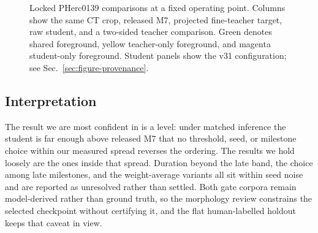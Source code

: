 \begin{figure}[t]
  \centering
  \caption{Locked PHerc0139 comparisons at a fixed operating point.
  Columns show the same CT crop, released M7, projected fine-teacher target, raw
  student, and a two-sided teacher comparison. Green denotes shared foreground,
  yellow teacher-only foreground, and magenta student-only foreground.
  Student panels show the v31 configuration; see
  Sec.~\ref{sec:figure-provenance}.}
  \label{fig:registered}
\end{figure}

\subsection{Interpretation}

The result we are most confident in is a level: under matched inference the
student is far enough above released M7 that no threshold, seed, or milestone
choice within our measured spread reverses the ordering.
The results we hold loosely are the ones inside that spread.
Duration beyond the late band, the choice among late milestones, and the
weight-average variants all sit within seed noise and are reported as
unresolved rather than settled.
Both gate corpora remain model-derived rather than ground truth, so the
morphology review constrains the selected checkpoint without certifying it,
and the flat human-labelled holdout keeps that caveat in view.
